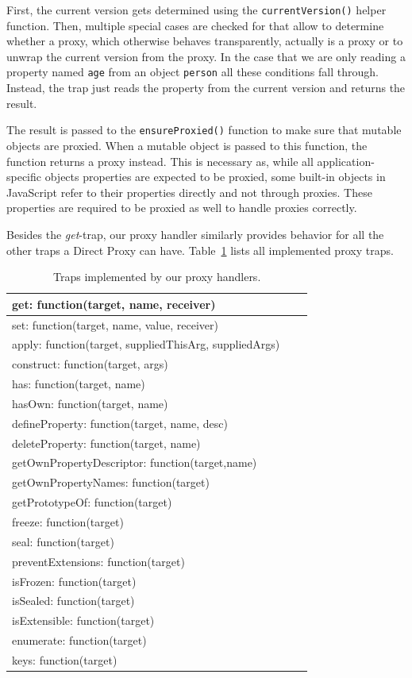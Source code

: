 First, the current version gets determined using the \lstinline{currentVersion()} helper function.
Then, multiple special cases are checked for that allow to determine whether a proxy, which otherwise behaves transparently, actually is a proxy or to unwrap the current version from the proxy.
In the case that we are only reading a property named \lstinline{age} from an object \lstinline{person} all these conditions fall through.
Instead, the trap just reads the property from the current version and returns the result.

The result is passed to the \lstinline{ensureProxied()} function to make sure that mutable objects are proxied.
When a mutable object is passed to this function, the function returns a proxy instead.
This is necessary as, while all application-specific objects properties are expected to be proxied, some built-in objects in JavaScript refer to their properties directly and not through proxies.
These properties are required to be proxied as well to handle proxies correctly.

Besides the \emph{get}-trap, our proxy handler similarly provides behavior for all the other traps a Direct Proxy can have.
Table~\ref{table:traps} lists all implemented proxy traps.

\begin{table}[h]
\begin{center}
\begin{tabular}{|l|l|r|}
\hline
get: function(target, name, receiver) \\ \hline
set: function(target, name, value, receiver) \\ \hline
apply: function(target, suppliedThisArg, suppliedArgs) \\ \hline
construct: function(target, args) \\ \hline
has: function(target, name) \\ \hline
hasOwn: function(target, name) \\ \hline
defineProperty: function(target, name, desc) \\ \hline
deleteProperty: function(target, name) \\ \hline
getOwnPropertyDescriptor: function(target,name) \\ \hline
getOwnPropertyNames: function(target) \\ \hline
getPrototypeOf: function(target) \\ \hline
freeze: function(target) \\ \hline
seal: function(target) \\ \hline
preventExtensions: function(target) \\ \hline
isFrozen: function(target) \\ \hline
isSealed: function(target) \\ \hline
isExtensible: function(target) \\ \hline
enumerate: function(target) \\ \hline
keys: function(target) \\ \hline
\end{tabular}
\caption[Table caption text]{Traps implemented by our proxy handlers.}
\label{table:traps}
\end{center}
\end{table}

